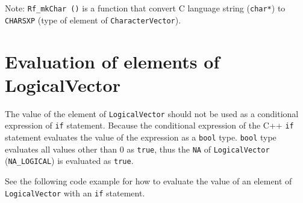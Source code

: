 \documentclass[]{book}
\theoremstyle{definition}
\theoremstyle{definition}
\theoremstyle{remark}
\begin{document}
Note: \texttt{Rf\_mkChar\ ()} is a function that convert C language
string (\texttt{char*}) to \texttt{CHARSXP} (type of element of
\texttt{CharacterVector}).

\section{Evaluation of elements of
LogicalVector}\label{evaluation-of-elements-of-logicalvector}

The value of the element of \texttt{LogicalVector} should not be used as
a conditional expression of \texttt{if} statement. Because the
conditional expression of the C++ \texttt{if} statement evaluates the
value of the expression as a \texttt{bool} type. \texttt{bool} type
evaluates all values other than 0 as \texttt{true}, thus the \texttt{NA}
of \texttt{LogicalVector} (\texttt{NA\_LOGICAL}) is evaluated as
\texttt{true}.

See the following code example for how to evaluate the value of an
element of \texttt{LogicalVector} with an \texttt{if} statement.
\end{document}
